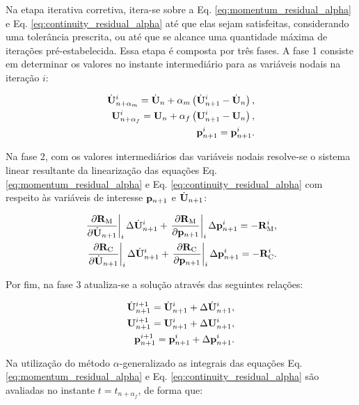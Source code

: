\documentclass[tese_patricia]{subfiles}%
\begin{document}
Na etapa iterativa corretiva, itera-se sobre a Eq. \eqref{eq:momentum_residual_alpha} e Eq. \eqref{eq:continuity_residual_alpha} até que elas sejam satisfeitas, considerando uma tolerância prescrita, ou até que se alcance uma quantidade máxima de iterações pré-estabelecida. Essa etapa é composta por três fases. A fase 1 consiste em determinar os valores no instante intermediário para as variáveis nodais na iteração $i$:

\begin{align}
\dot{\mathbf{U}}_{n+\alpha_m}^{i} = \dot{\mathbf{U}}_n + \alpha_m \left( \dot{\mathbf{U}}_{n+1}^{i} - \dot{\mathbf{U}}_n \right), \label{eq:approx_accelerationI}\\
\mathbf{U}_{n+\alpha_f}^{i} = \mathbf{U}_n + \alpha_f \left( \mathbf{U}_{n+1}^{i} - \mathbf{U}_n \right), \label{eq:approx_velocityI}\\
\mathbf{p}_{n+1}^{i} = \mathbf{p}_{n+1}^{i} \label{eq:approx_pressI}.
\end{align}

Na fase 2, com os valores intermediários das variáveis nodais resolve-se o sistema linear resultante da linearização das equações Eq. \eqref{eq:momentum_residual_alpha} e Eq. \eqref{eq:continuity_residual_alpha} com respeito às variáveis de interesse $\mathbf{p}_{n+1}$ e $\dot{\mathbf{U}}_{n+1}$:

\begin{align}
\left .\frac{\partial\mathbf{R}_\mathrm{M}}{\partial\dot{\mathbf{U}}_{n+1}}\right|_{i} \Delta \dot{\mathbf{U}}_{n+1}^{i} + \left .\frac{\partial\mathbf{R}_\mathrm{M}}{\partial\mathbf{p}_{n+1}}\right|_{i} \Delta \mathbf{p}_{n+1}^{i} = -\mathbf{R}_\mathrm{M}^{i}, \label{eq:NR1} \\
\left .\frac{\partial\mathbf{R}_\mathrm{C}}{\partial\dot{\mathbf{U}}_{n+1}}\right|_{i} \Delta \dot{\mathbf{U}}_{n+1}^{i} + \left .\frac{\partial\mathbf{R}_\mathrm{C}}{\partial\mathbf{p}_{n+1}}\right|_{i} \Delta \mathbf{p}_{n+1}^{i} = -\mathbf{R}_\mathrm{C}^{i}.\label{eq:NR2}
\end{align}

Por fim, na fase 3 atualiza-se a solução através das seguintes relações:

\begin{align}
\dot{\mathbf{U}}_{n+1}^{i+1} = \dot{\mathbf{U}}_{n+1}^{i} + \Delta\dot{\mathbf{U}}_{n+1}^{i},\label{update1} \\ 
\mathbf{U}_{n+1}^{i+1} = \mathbf{U}_{n+1}^{i} + \Delta\mathbf{U}_{n+1}^{i},\label{update2}\\
\mathbf{p}_{n+1}^{i+1} = \mathbf{p}_{n+1}^{i} + \Delta\mathbf{p}_{n+1}^{i}.\label{update3}
\end{align}

Na utilização do método $\alpha$-generalizado as integrais das equações Eq. \eqref{eq:momentum_residual_alpha} e Eq. \eqref{eq:continuity_residual_alpha} são avaliadas no instante $t = t_{n+\alpha_{f}}$, de forma que:
\end{document}
